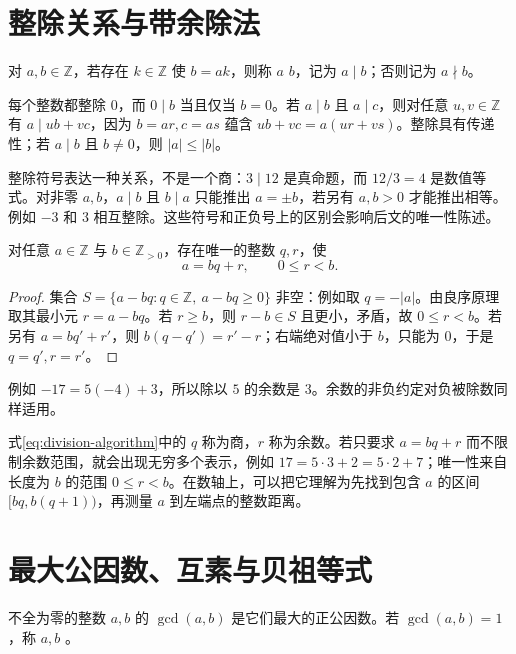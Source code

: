 \documentclass[UTF8,12pt,a4paper,fontset=fandol]{ctexbook}
\begin{document}
\section{整除关系与带余除法}

\begin{definition}
对 $a,b\in\mathbb Z$，若存在 $k\in\mathbb Z$ 使 $b=ak$，则称 $a$  $b$，记为 $a\mid b$；否则记为 $a\nmid b$。
\end{definition}

每个整数都整除 $0$，而 $0\mid b$ 当且仅当 $b=0$。若 $a\mid b$ 且 $a\mid c$，则对任意 $u,v\in\mathbb Z$ 有 $a\mid ub+vc$，因为 $b=ar,c=as$ 蕴含 $ub+vc=a(ur+vs)$。整除具有传递性；若 $a\mid b$ 且 $b\ne0$，则 $|a|\le|b|$。

整除符号表达一种关系，不是一个商：$3\mid12$ 是真命题，而 $12/3=4$ 是数值等式。对非零 $a,b$，$a\mid b$ 且 $b\mid a$ 只能推出 $a=\pm b$，若另有 $a,b>0$ 才能推出相等。例如 $-3$ 和 $3$ 相互整除。这些符号和正负号上的区别会影响后文的唯一性陈述。

\begin{theorem}
\label{thm:division}
对任意 $a\in\mathbb Z$ 与 $b\in\mathbb Z_{>0}$，存在唯一的整数 $q,r$，使
\begin{equation}
  a=bq+r,\qquad 0\le r<b.
  \label{eq:division-algorithm}
\end{equation}
\end{theorem}
\begin{proof}
集合 $S=\{a-bq:q\in\mathbb Z,\ a-bq\ge0\}$ 非空：例如取 $q=-|a|$。由良序原理取其最小元 $r=a-bq$。若 $r\ge b$，则 $r-b\in S$ 且更小，矛盾，故 $0\le r<b$。若另有 $a=bq'+r'$，则 $b(q-q')=r'-r$；右端绝对值小于 $b$，只能为 $0$，于是 $q=q',r=r'$。
\end{proof}

例如 $-17=5(-4)+3$，所以除以 $5$ 的余数是 $3$。余数的非负约定对负被除数同样适用。

式\eqref{eq:division-algorithm}中的 $q$ 称为商，$r$ 称为余数。若只要求 $a=bq+r$ 而不限制余数范围，就会出现无穷多个表示，例如 $17=5\cdot3+2=5\cdot2+7$；唯一性来自长度为 $b$ 的范围 $0\le r<b$。在数轴上，可以把它理解为先找到包含 $a$ 的区间 $[bq,b(q+1))$，再测量 $a$ 到左端点的整数距离。

\section{最大公因数、互素与贝祖等式}

\begin{definition}
不全为零的整数 $a,b$ 的 $\gcd(a,b)$ 是它们最大的正公因数。若 $\gcd(a,b)=1$，称 $a,b$ 。
\end{definition}
\end{document}
